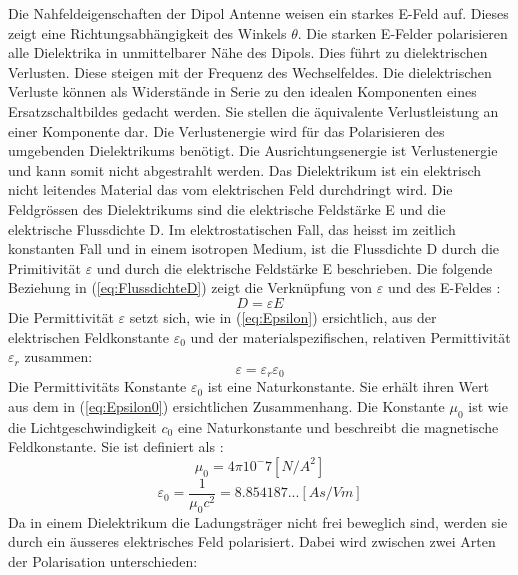 Die Nahfeldeigenschaften der Dipol Antenne weisen ein starkes E-Feld auf. Dieses zeigt eine Richtungsabhängigkeit des Winkels $\theta$. Die starken E-Felder polarisieren alle Dielektrika in unmittelbarer Nähe des Dipols. Dies führt zu dielektrischen Verlusten. Diese steigen mit der Frequenz des Wechselfeldes. Die dielektrischen Verluste können als Widerstände in Serie zu den idealen Komponenten eines Ersatzschaltbildes gedacht werden. Sie stellen die äquivalente Verlustleistung an einer Komponente dar. Die Verlustenergie wird für das Polarisieren des umgebenden Dielektrikums benötigt. Die Ausrichtungsenergie ist Verlustenergie und kann somit nicht abgestrahlt werden.
Das Dielektrikum ist ein elektrisch nicht leitendes Material das vom elektrischen Feld durchdringt wird. Die Feldgrössen des Dielektrikums sind die elektrische Feldstärke E und die elektrische Flussdichte D. Im elektrostatischen Fall, das heisst im zeitlich konstanten Fall und in einem isotropen Medium, ist die Flussdichte D durch die Primitivität $\varepsilon $ und durch die elektrische Feldstärke E beschrieben. Die folgende Beziehung in (\ref{eq:FlussdichteD}) zeigt die Verknüpfung von $\varepsilon$ und des E-Feldes \cite{Emant}:
\begin{equation}\label{eq:FlussdichteD}
D=\varepsilon E
\end{equation}
Die Permittivität $\varepsilon$ setzt sich, wie in (\ref{eq:Epsilon}) ersichtlich, aus der elektrischen Feldkonstante $\varepsilon_0$ und der materialspezifischen, relativen Permittivität $\varepsilon_r$ zusammen:
\begin{equation}\label{eq:Epsilon}
\varepsilon = \varepsilon_r \varepsilon_0
\end{equation}
Die Permittivitäts Konstante $\varepsilon_{0}$ ist eine Naturkonstante. Sie erhält ihren Wert aus dem in (\ref{eq:Epsilon0}) ersichtlichen Zusammenhang. Die Konstante $\mu_{0}$ ist wie die Lichtgeschwindigkeit $c_0$ eine Naturkonstante und beschreibt die magnetische Feldkonstante. Sie ist definiert als \cite {WikiPermitt}: 
\begin{equation}\label{mu_0}
\mu_{0}=4\pi10^-7 [N/A^{2}] 
\end{equation}
\begin{equation}\label{eq:Epsilon0}
\varepsilon_{0} = \dfrac{1}{\mu_{0}c^{2}}=8.854187...[As/Vm]
\end{equation}
Da in einem Dielektrikum die Ladungsträger nicht frei beweglich sind, werden sie durch ein äusseres elektrisches Feld polarisiert. Dabei wird zwischen zwei Arten der Polarisation unterschieden:
